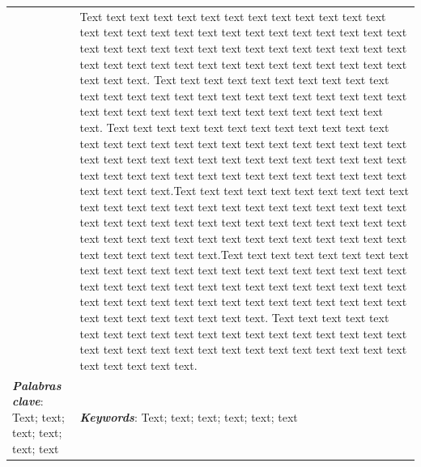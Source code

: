 \documentclass[12pt,twoside]{apa7}
\newcommand{\keywordA}[1]{\vspace{\baselineskip}\parindent 0pt\textit{\textbf{Keywords}}: #1}
\newcommand{\palabrasclave}[1]{\vspace{\baselineskip}\parindent 0pt\textbf{\textit{Palabras clave}}: #1}
\begin{document}
\begin{table}[htb]
\begin{tabular}{p{8.5cm}p{8.5cm}}
& \small Text text text text text text text text text text text text text text text text text text text text text text text text text text text text text text text text text text text text text text text text text text text text text text text text text text text text text text text text text text. Text text text text text text text text text text text text text text text text text text text text text text text text text text text text text text text text text text text text text text. Text text text text text text text text text text text text text text text text text text text text text text text text text text text text text text text text text text text text text text text text text text text text text text text text text text text text text text text text text text.Text text text text text text text text text text text text text text text text text text text text text text text text text text text text text text text text text text text text text text text text text text text text text text text text text text text text text text text text text text.Text text text text text text text text text text text text text text text text text text text text text text text text text text text text text text text text text text text text text text text text text text text text text text text text text text text text text text text text text text. Text text text text text text text text text text text text text text text text text text text text text text text text text text text text text text text text text text text text text text.  
\\[-0.9cm]
\small \palabrasclave{Text; text; text; text; text; text} & 
\small \keywordA{Text; text; text; text; text; text}  \\
\end{tabular}
\end{table}
\end{document}
